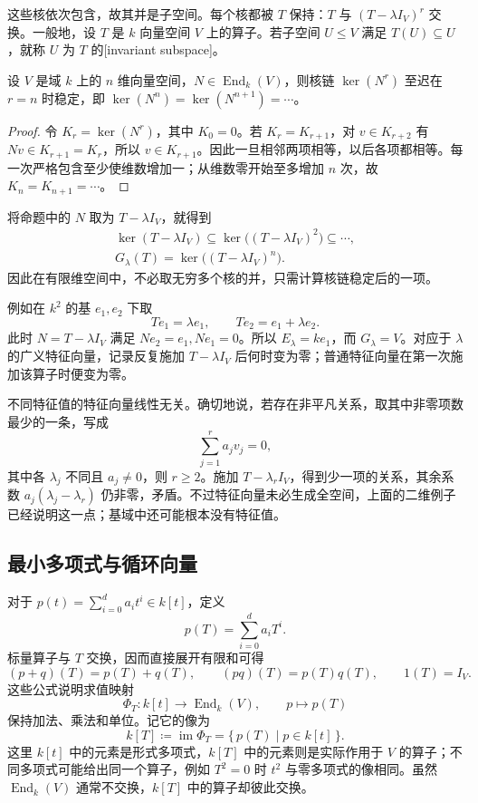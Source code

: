这些核依次包含，故其并是子空间。每个核都被 \(T\) 保持：\(T\) 与 \((T-\lambda I_V)^r\) 交换。一般地，设 \(T\) 是 \(k\) 向量空间 \(V\) 上的算子。若子空间 \(U\le V\) 满足 \(T(U)\subseteq U\)，就称 \(U\) 为 \(T\) 的[invariant subspace]。

\begin{proposition}\label{b2:prop:kernel-power-stability}
	设 \(V\) 是域 \(k\) 上的 \(n\) 维向量空间，\(N\in\operatorname{End}_k(V)\)，则核链 \(\ker(N^r)\) 至迟在 \(r=n\) 时稳定，即 \(\ker(N^n)=\ker(N^{n+1})=\cdots\)。
\end{proposition}
\begin{proof}
	令 \(K_r=\ker(N^r)\)，其中 \(K_0=0\)。若 \(K_r=K_{r+1}\)，对 \(v\in K_{r+2}\) 有 \(Nv\in K_{r+1}=K_r\)，所以 \(v\in K_{r+1}\)。因此一旦相邻两项相等，以后各项都相等。每一次严格包含至少使维数增加一；从维数零开始至多增加 \(n\) 次，故 \(K_n=K_{n+1}=\cdots\)。
\end{proof}

将命题中的 \(N\) 取为 \(T-\lambda I_V\)，就得到
\[
	\begin{gathered}
		\ker(T-\lambda I_V)\subseteq\ker\bigl((T-\lambda I_V)^2\bigr)\subseteq\cdots,\\
		G_\lambda(T)=\ker\bigl((T-\lambda I_V)^n\bigr).
	\end{gathered}
\]
因此在有限维空间中，不必取无穷多个核的并，只需计算核链稳定后的一项。

\ProseParagraphBreak
例如在 \(k^2\) 的基 \(e_1,e_2\) 下取
\[
	Te_1=\lambda e_1,\qquad Te_2=e_1+\lambda e_2.
\]
此时 \(N=T-\lambda I_V\) 满足 \(Ne_2=e_1,Ne_1=0\)。所以 \(E_\lambda=ke_1\)，而 \(G_\lambda=V\)。对应于 \(\lambda\) 的广义特征向量，记录反复施加 \(T-\lambda I_V\) 后何时变为零；普通特征向量在第一次施加该算子时便变为零。

\ProseParagraphBreak
不同特征值的特征向量线性无关。确切地说，若存在非平凡关系，取其中非零项数最少的一条，写成
\[
	\sum_{j=1}^ra_jv_j=0,
\]
其中各 \(\lambda_j\) 不同且 \(a_j\ne0\)，则 \(r\ge2\)。施加 \(T-\lambda_rI_V\)，得到少一项的关系，其余系数 \(a_j(\lambda_j-\lambda_r)\) 仍非零，矛盾。不过特征向量未必生成全空间，上面的二维例子已经说明这一点；基域中还可能根本没有特征值。

\subsection{最小多项式与循环向量}
\label{b2:subsec:0103:02}

对于 \(p(t)=\sum_{i=0}^da_it^i\in k[t]\)，定义
\[
	p(T)=\sum_{i=0}^da_iT^i.
\]
标量算子与 \(T\) 交换，因而直接展开有限和可得
\[
	(p+q)(T)=p(T)+q(T),\qquad (pq)(T)=p(T)q(T),\qquad 1(T)=I_V.
\]
这些公式说明求值映射
\[
	\Phi_T:k[t]\longrightarrow\operatorname{End}_k(V),\qquad p\longmapsto p(T)
\]
保持加法、乘法和单位。记它的像为
\[
	k[T]\coloneqq\operatorname{im}\Phi_T=\{\,p(T)\mid p\in k[t]\,\}.
\]
这里 \(k[t]\) 中的元素是形式多项式，\(k[T]\) 中的元素则是实际作用于 \(V\) 的算子；不同多项式可能给出同一个算子，例如 \(T^2=0\) 时 \(t^2\) 与零多项式的像相同。虽然 \(\operatorname{End}_k(V)\) 通常不交换，\(k[T]\) 中的算子却彼此交换。

